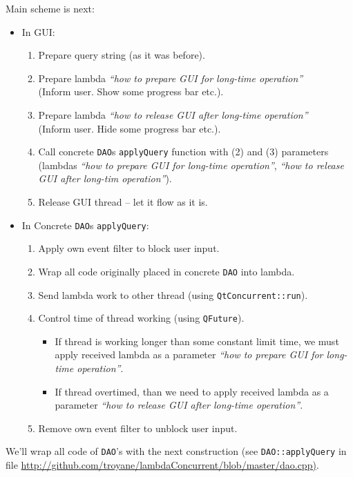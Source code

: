 \documentclass[a4paper,12pt]{scrartcl}
\begin{document}
Main scheme is next:
\begin{itemize}
 \item In GUI:
 \begin{enumerate}
  \item Prepare query string (as it was before).
  \item Prepare lambda \textit{``how to prepare GUI for long-time operation''} \\(Inform user. Show some progress bar etc.).
  \item Prepare lambda \textit{``how to release GUI after long-time operation''} \\(Inform user. Hide some progress bar etc.).
  \item Call concrete \texttt{DAO}s \texttt{applyQuery} function with (2) and (3) parameters (lambdas 
    \textit{``how to prepare GUI for long-time operation''}, \textit{``how to release GUI after long-tim operation''}).
  \item Release GUI thread -- let it flow as it is.
 \end{enumerate}
 \item In Concrete \texttt{DAO}s \texttt{applyQuery}:
 \begin{enumerate}
  \item Apply own event filter to block user input.
  \item Wrap all code originally placed in concrete \texttt{DAO} into lambda.
  \item Send lambda work to other thread (using \texttt{QtConcurrent::run}).
  \item Control time of thread working (using \texttt{QFuture}).
  \begin{itemize}
   \item If thread is working longer than some constant limit time, we must apply received lambda as a parameter 
    \textit{``how to prepare GUI for long-time operation''}.
   \item If thread overtimed, than we need to apply received lambda as a parameter \textit{``how to release GUI after long-time operation''}.
  \end{itemize}
  \item Remove own event filter to unblock user input.
 \end{enumerate}
\end{itemize}

We'll wrap all code of \texttt{DAO}'s with the next construction (see \texttt{DAO::applyQuery} in file 
\url{http://github.com/troyane/lambdaConcurrent/blob/master/dao.cpp)}.
\end{document}
